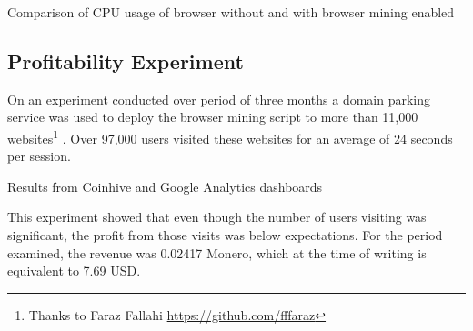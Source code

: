 \begin{center}
	\caption{Comparison of CPU usage of browser without and with browser mining enabled}
\end{center}
\vspace*{-2mm}

\subsection{\textbf{Profitability Experiment}}
\label{profitabilitexperiment}
On an experiment conducted over period of three months a domain parking service was used to deploy the browser mining script to more than 11,000 websites\footnote{Thanks to Faraz Fallahi \url{https://github.com/fffaraz}} . Over 97,000 users visited these websites for an average of 24 seconds per session.
\\
\vspace*{-1mm}
\begin{center}
	\caption{Results from Coinhive and Google Analytics dashboards}
\end{center}
\vspace*{-1mm}

This experiment showed that even though the number of users visiting was significant, the profit from those visits was below expectations. For the period examined, the revenue was 0.02417 Monero, which at the time of writing is equivalent to 7.69 USD.

